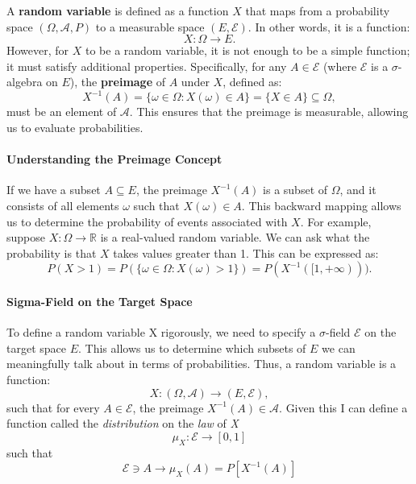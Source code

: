     A \textbf{random variable} is defined as a function \( X \) that maps from a probability space \( (\Omega, \mathcal{A}, P) \) to a measurable space \( (E, \mathcal{E}) \). In other words, it is a function:
    \[
    X : \Omega \to E.
    \]
    However, for \( X \) to be a random variable, it is not enough to be a simple function; it must satisfy additional properties. Specifically, for any \( A \in \mathcal{E} \) (where \( \mathcal{E} \) is a $\sigma$-algebra on \( E \)), the \textbf{preimage} of \( A \) under \( X \), defined as:
    \[
    X^{-1}(A) = \{ \omega \in \Omega : X(\omega) \in A \} = \{X \in A\} \subseteq \Omega,
    \]
    must be an element of \( \mathcal{A} \). This ensures that the preimage is measurable, allowing us to evaluate probabilities.
    
    \paragraph{Understanding the Preimage Concept}
    
    If we have a subset \( A \subseteq E \), the preimage \( X^{-1}(A) \) is a subset of \( \Omega \), and it consists of all elements \( \omega \) such that \( X(\omega) \in A \). This backward mapping allows us to determine the probability of events associated with \( X \). \newline
    For example, suppose \( X: \Omega \to \mathbb{R} \) is a real-valued random variable. We can ask what the probability is that \( X \) takes values greater than 1. This can be expressed as:
    \[
    P(X > 1) = P(\{\omega \in \Omega : X(\omega) > 1\}) = P(X^{-1}([1, +\infty))).
    \]
    
    \paragraph{Sigma-Field on the Target Space}
    
    To define a random variable X rigorously, we need to specify a $\sigma$-field \( \mathcal{E} \) on the target space \( E \). This allows us to determine which subsets of \( E \) we can meaningfully talk about in terms of probabilities. Thus, a random variable is a function:
    \[
    X : (\Omega, \mathcal{A}) \to (E, \mathcal{E}),
    \]
    such that for every \( A \in \mathcal{E} \), the preimage \( X^{-1}(A) \in \mathcal{A} \). Given this I can define a function called the \textit{distribution} on the \textit{law} of \textit{X}
    \[
    \mu_{X}: \mathcal{E} \rightarrow [0,1]
    \]
    such that 
    \[
    \mathcal{E} \ni A \rightarrow \mu_{X}(A) = P[X^{-1}(A)]
    \]
    
